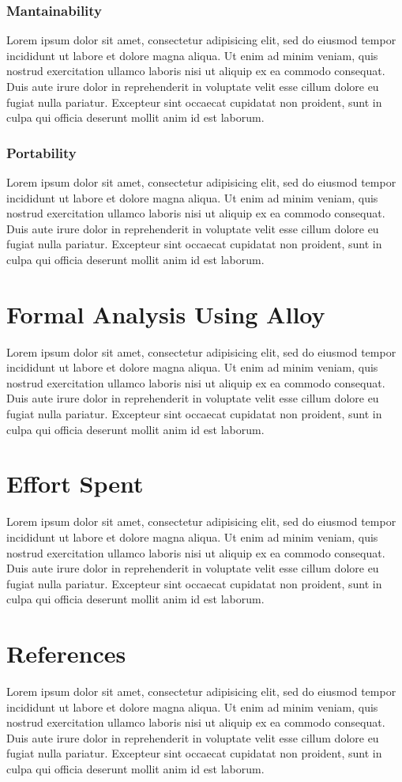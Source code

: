 \documentclass[10pt,a4paper]{report}
\begin{document}
	\subsection{Mantainability}
	Lorem ipsum dolor sit amet, consectetur adipisicing elit, sed do eiusmod
	tempor incididunt ut labore et dolore magna aliqua. Ut enim ad minim veniam,
	quis nostrud exercitation ullamco laboris nisi ut aliquip ex ea commodo
	consequat. Duis aute irure dolor in reprehenderit in voluptate velit esse
	cillum dolore eu fugiat nulla pariatur. Excepteur sint occaecat cupidatat non
	proident, sunt in culpa qui officia deserunt mollit anim id est laborum.
	
	\subsection{Portability}
	Lorem ipsum dolor sit amet, consectetur adipisicing elit, sed do eiusmod
	tempor incididunt ut labore et dolore magna aliqua. Ut enim ad minim veniam,
	quis nostrud exercitation ullamco laboris nisi ut aliquip ex ea commodo
	consequat. Duis aute irure dolor in reprehenderit in voluptate velit esse
	cillum dolore eu fugiat nulla pariatur. Excepteur sint occaecat cupidatat non
	proident, sunt in culpa qui officia deserunt mollit anim id est laborum.
	
	\chapter{Formal Analysis Using Alloy}
	Lorem ipsum dolor sit amet, consectetur adipisicing elit, sed do eiusmod
	tempor incididunt ut labore et dolore magna aliqua. Ut enim ad minim veniam,
	quis nostrud exercitation ullamco laboris nisi ut aliquip ex ea commodo
	consequat. Duis aute irure dolor in reprehenderit in voluptate velit esse
	cillum dolore eu fugiat nulla pariatur. Excepteur sint occaecat cupidatat non
	proident, sunt in culpa qui officia deserunt mollit anim id est laborum.
	
	\chapter{Effort Spent}
	Lorem ipsum dolor sit amet, consectetur adipisicing elit, sed do eiusmod
	tempor incididunt ut labore et dolore magna aliqua. Ut enim ad minim veniam,
	quis nostrud exercitation ullamco laboris nisi ut aliquip ex ea commodo
	consequat. Duis aute irure dolor in reprehenderit in voluptate velit esse
	cillum dolore eu fugiat nulla pariatur. Excepteur sint occaecat cupidatat non
	proident, sunt in culpa qui officia deserunt mollit anim id est laborum.
	
	\chapter{References}
	Lorem ipsum dolor sit amet, consectetur adipisicing elit, sed do eiusmod
	tempor incididunt ut labore et dolore magna aliqua. Ut enim ad minim veniam,
	quis nostrud exercitation ullamco laboris nisi ut aliquip ex ea commodo
	consequat. Duis aute irure dolor in reprehenderit in voluptate velit esse
	cillum dolore eu fugiat nulla pariatur. Excepteur sint occaecat cupidatat non
	proident, sunt in culpa qui officia deserunt mollit anim id est laborum.
	
\end{document}
